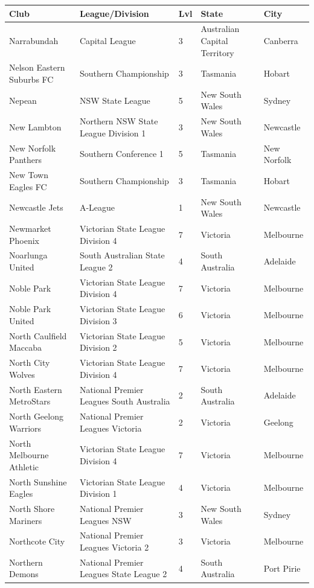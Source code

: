 \documentclass{article}
\begin{document}
\begin{tabular}{lllll}
\toprule
Club & League/Division & Lvl & State & City \\
\midrule
Narrabundah & Capital League & 3 & Australian Capital Territory & Canberra \\
Nelson Eastern Suburbs FC & Southern Championship & 3 & Tasmania & Hobart \\
Nepean & NSW State League & 5 & New South Wales & Sydney \\
New Lambton & Northern NSW State League Division 1 & 3 & New South Wales & Newcastle \\
New Norfolk Panthers & Southern Conference 1 & 5 & Tasmania & New Norfolk \\
New Town Eagles FC & Southern Championship & 3 & Tasmania & Hobart \\
Newcastle Jets & A-League & 1 & New South Wales & Newcastle \\
Newmarket Phoenix & Victorian State League Division 4 & 7 & Victoria & Melbourne \\
Noarlunga United & South Australian State League 2 & 4 & South Australia & Adelaide \\
Noble Park & Victorian State League Division 4 & 7 & Victoria & Melbourne \\
Noble Park United & Victorian State League Division 3 & 6 & Victoria & Melbourne \\
North Caulfield Maccaba & Victorian State League Division 2 & 5 & Victoria & Melbourne \\
North City Wolves & Victorian State League Division 4 & 7 & Victoria & Melbourne \\
North Eastern MetroStars & National Premier Leagues South Australia & 2 & South Australia & Adelaide \\
North Geelong Warriors & National Premier Leagues Victoria & 2 & Victoria & Geelong \\
North Melbourne Athletic & Victorian State League Division 4 & 7 & Victoria & Melbourne \\
North Sunshine Eagles & Victorian State League Division 1 & 4 & Victoria & Melbourne \\
North Shore Mariners & National Premier Leagues NSW & 3 & New South Wales & Sydney \\
Northcote City & National Premier Leagues Victoria 2 & 3 & Victoria & Melbourne \\
Northern Demons & National Premier Leagues State League 2 & 4 & South Australia & Port Pirie \\
\bottomrule
\end{tabular}
\end{document}
